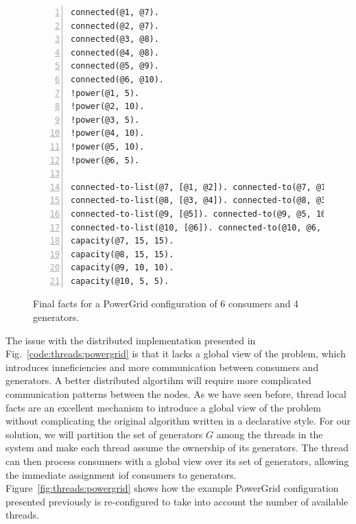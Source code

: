 \begin{figure}[h!]
\begin{Verbatim}[numbers=left,fontsize=\codesize,commandchars=*\#\&]
connected(@1, @7).
connected(@2, @7).
connected(@3, @8).
connected(@4, @8).
connected(@5, @9).
connected(@6, @10).
!power(@1, 5).
!power(@2, 10).
!power(@3, 5).
!power(@4, 10).
!power(@5, 10).
!power(@6, 5).

connected-to-list(@7, [@1, @2]). connected-to(@7, @1, 5). connected-to(@7, @2, 10).
connected-to-list(@8, [@3, @4]). connected-to(@8, @3, 5). connected-to(@8, @4, 10).
connected-to-list(@9, [@5]). connected-to(@9, @5, 10).
connected-to-list(@10, [@6]). connected-to(@10, @6, 5).
capacity(@7, 15, 15).
capacity(@8, 15, 15).
capacity(@9, 10, 10).
capacity(@10, 5, 5).
\end{Verbatim}
\caption{Final facts for a PowerGrid configuration of 6 consumers and 4 generators.}
\label{code:threads:powergrid_final}
\end{figure}

The issue with the distributed implementation presented in
Fig.~\ref{code:threads:powergrid} is that it lacks a global view of the problem,
which introduces inneficiencies and more communication between consumers and
generators. A better distributed algortihm will require more complicated
communication patterns between the nodes.  As we have seen before, thread local
facts are an excellent mechanism to introduce a global view of the problem
without complicating the original algorithm written in a declarative style. For
our solution, we will partition the set of generators $G$ among the threads in
the system and make each thread assume the ownership of its generators. The
thread can then process consumers with a global view over its set of generators,
allowing the immediate assignment iof consumers to generators.
Figure~\ref{fig:threads:powergrid} shows how the example PowerGrid configuration
presented previously is re-configured to take into account the number of
available threads.


